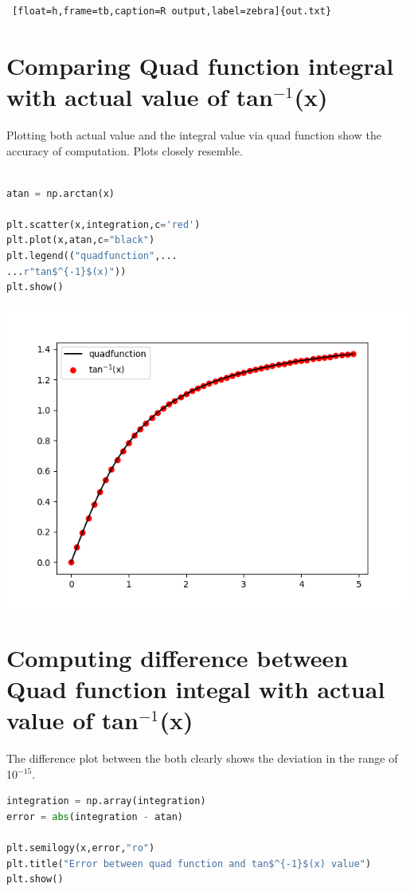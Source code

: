 \documentclass[letterpaper, 12pt]{article}
\begin{document}
\begin{multicols}{2}
\begin{lstlisting} [float=h,frame=tb,caption=R output,label=zebra]{out.txt}
\end{lstlisting}
\section{Comparing Quad function integral with actual value of tan$^{-1}$(x)}
Plotting both actual value and the integral value via quad function show the accuracy of computation. Plots closely resemble.
\begin{lstlisting}[language=Python , caption=Comparing Quad function integal with actual value of tan$^{-1}$(x)]

atan = np.arctan(x)

plt.scatter(x,integration,c='red')
plt.plot(x,atan,c="black")
plt.legend(("quadfunction",...
...r"tan$^{-1}$(x)"))
plt.show()
\end{lstlisting}
\includegraphics[width=\columnwidth]{Figure_1-2.png}
\section{Computing difference between Quad function integal with actual value of tan$^{-1}$(x)}
The difference plot between the both clearly shows the deviation in the range of 10$^{-15}$.
\end{multicols}
\begin{lstlisting}[language=Python , caption=Comparing Quad function integal with actual value of tan$^{-1}$(x)]
integration = np.array(integration)
error = abs(integration - atan)

plt.semilogy(x,error,"ro")
plt.title("Error between quad function and tan$^{-1}$(x) value")	
plt.show()
\end{lstlisting}
\end{document}
